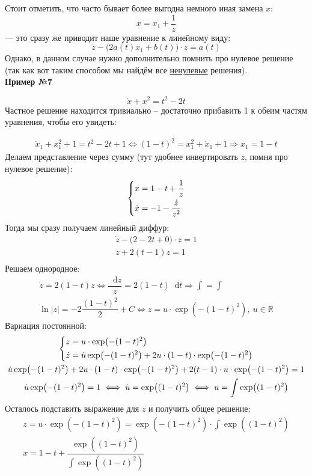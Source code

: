 \documentclass[a4paper,12pt]{article}
\newcommand{\R}{\mathbb{R}}
\renewcommand*\d{\mathop{}\!\mathrm{d}}
\newcommand{\du}{\dot{u}}
\newcommand{\dx}{\dot{x}}
\newcommand{\dz}{\dot{z}}
\newcommand{\ds}{\displaystyle}
\begin{document}
Стоит отметить, что часто бывает более выгодна немного иная замена $x$:
\[x = x_1 + \dfrac{1}{z}\] --- это сразу же приводит наше уравнение к линейному виду:
\[\dz - \big(2a(t)x_1 + b(t)\big) \cdot z = a(t)\] Однако, в данном случае нужно дополнительно помнить про нулевое решение (так как вот таким способом мы найдём все \underline{ненулевые} решения).
\ \\

\textbf{Пример №7}

\[\dx + x^2 = t^2 - 2t\]
Частное решение находится тривиально -- достаточно прибавить 1 к обеим частям уравнения, чтобы его увидеть:

\begin{gather*}
\dx_1 + x_1^2 + 1 = t^2 - 2t + 1 \iff (1 - t)^2 = x_1^2 + \dx_1 + 1 \Longrightarrow x_1 = 1 - t
\end{gather*}
Делаем представление через сумму (тут удобнее инвертировать $z$, помня про нулевое решение):
\[\left\{\begin{gathered}
x = 1 - t + \dfrac{1}{z}\hfill\\
\dx = -1 -\dfrac{\dz}{z^2}\hfill
\end{gathered}\right.\]
Тогда мы сразу получаем линейный диффур:
\begin{gather*}
\dz - \big(2 - 2t + 0\big) \cdot z = 1\\
\dz + 2(t - 1)z = 1\\
\end{gather*}
Решаем однородное:
\begin{gather*}
\dz = 2(1 - t)z \iff \dfrac{\d z}{z} = 2(1 - t)\d t \Longrightarrow \ds\int = \int\\
\ln|z| = -2\dfrac{(1 - t)^2}{2} + C \iff z = u \cdot \exp(-(1 - t)^2),\ u \in \R
\end{gather*}
Вариация постоянной:
\begin{gather*}
\left\{\begin{gathered}
z = u \cdot \exp(-(1 - t)^2)\hfill\\
\dz = \du\exp(-(1 - t)^2) + 2u \cdot (1 - t) \cdot \exp(-(1 - t)^2) \hfill
\end{gathered}\right.\\
\du\exp(-(1 - t)^2) + 2u \cdot (1 - t) \cdot \exp(-(1 - t)^2) + 2(t - 1) \cdot u \cdot \exp(-(1 - t)^2) = 1\\
\du\exp(-(1 - t)^2) = 1 \iff \du = \exp((1 - t)^2) \iff u = \ds\int \exp((1 - t)^2)
\end{gather*}
Осталось подставить выражение для $z$ и получить общее решение:
\begin{gather*}
z = u \cdot \exp(-(1 - t)^2) = \exp(-(1 - t)^2) \cdot \ds\int \exp((1 - t)^2)\\
x = 1 - t + \dfrac{\exp((1 - t)^2)}{\ds\int \exp((1 - t)^2)}
\end{gather*}
\end{document}
